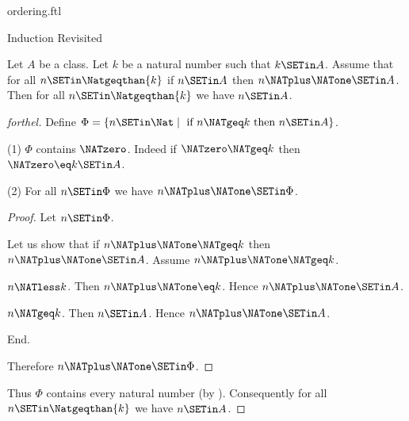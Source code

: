 \documentclass{naproche-library}
\begin{document}
\begin{smodule}[title=The Standard Ordering of the Natural Numbers]{ordering.ftl}
\begin{sfragment}{Induction Revisited}
  \begin{theorem}[forthel,id=ARITHMETIC_04_4976599269113856]
    Let $A$ be a class.
    Let $k$ be a natural number such that $k \SETin A$.
    Assume that for all $n \SETin \Natgeqthan{k}$ if $n \SETin A$ then $n \NATplus \NATone \SETin A$.
    Then for all $n \SETin \Natgeqthan{k}$ we have $n \SETin A$.
  \end{theorem}
  \begin{proof}[forthel]
    Define $\Phi = \{n \SETin \Nat \mid\text{ if }n \NATgeq k\text{ then }n \SETin A \}$.

    (1) $\Phi$ contains $\NATzero$.
    Indeed if $\NATzero \NATgeq k$ then $\NATzero \eq k \SETin A$.

    (2) For all $n \SETin \Phi$ we have $n \NATplus \NATone \SETin \Phi$.
    \begin{proof}
      Let $n \SETin \Phi$.

      Let us show that if $n \NATplus \NATone \NATgeq k$ then $n \NATplus \NATone \SETin A$.
        Assume $n \NATplus \NATone \NATgeq k$.

        \begin{case}{$n \NATless k$.}
          Then $n \NATplus \NATone \eq k$.
          Hence $n \NATplus \NATone \SETin A$.
        \end{case}

        \begin{case}{$n \NATgeq k$.}
          Then $n \SETin A$.
          Hence $n \NATplus \NATone \SETin A$.
        \end{case}
      End.

      Therefore $n \NATplus \NATone \SETin \Phi$.
    \end{proof}

    Thus $\Phi$ contains every natural number (by ).
    Consequently for all $n \SETin \Natgeqthan{k}$ we have $n \SETin A$.
  \end{proof}
\end{sfragment}
\end{smodule}
\end{document}
